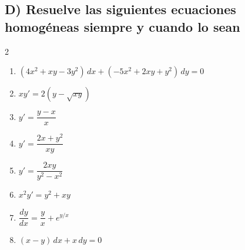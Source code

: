 \documentclass[a4paper,12pt]{article}
\begin{document}
\subsection*{D) Resuelve las siguientes ecuaciones homogéneas siempre y cuando lo sean}
\begin{multicols}{2}
\begin{enumerate}
    \item $(4x^{2} +xy-3y^{2} )\,dx+(-5x^{2} +2xy+y^{2} )\,dy=0$
    \item $xy'=2(y-\sqrt{xy})$
    \item $y' = \dfrac{y-x}{x}$
    \item $y' = \dfrac{2x+y^2}{xy}$
    \item $y' = \dfrac{2xy}{y^2-x^2}$
    \item $x^2 y' = y^2 + xy$
    \item $\dfrac{dy}{dx} = \dfrac{y}{x} + e^{y/x}$
    \item $(x-y) \, dx + x \, dy = 0$
\end{enumerate}
\end{multicols}
\end{document}
